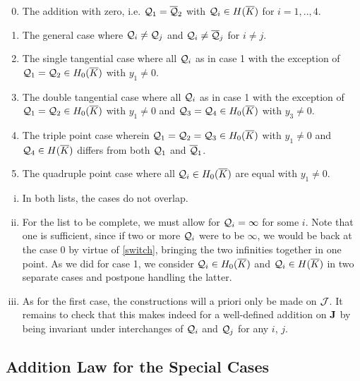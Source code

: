 \documentclass[english,11pt,a4paper]{article}
\begin{document}
\vspace{-3mm}
\fline
\begin{enumerate}\setcounter{enumi}{-1}
  \parskip 1mm
  \item The addition with zero, i.e. $\mathcal{Q}_1 = \overline {\mathcal{Q}}_2$ with $\mathcal{Q}_i \in H(\overline K)$ for $i = 1,..,4$.
  \item The general case where $\mathcal{Q}_i \neq \mathcal{Q}_j$ and $\mathcal{Q}_i \neq \overline {\mathcal{Q}}_j$ for $i \neq j$.
  \item The single tangential case where all $\mathcal{Q}_i$ as in case 1 with the exception of $\mathcal{Q}_1 = \mathcal{Q}_2 \in H_0(\overline K)$ with $y_1 \neq 0$.
  \item The double tangential case where all $\mathcal{Q}_i$ as in case 1 with the exception of $\mathcal{Q}_1 = \mathcal{Q}_2 \in H_0(\overline K)$ with $y_1 \neq 0$ and $\mathcal{Q}_3 = \mathcal{Q}_4 \in H_0(\overline K)$ with $y_3 \neq 0$.
  \item The triple point case wherein $\mathcal{Q}_1=\mathcal{Q}_2=\mathcal{Q}_3 \in H_0(\overline K)$ with $y_1 \neq 0$ and $\mathcal{Q}_4 \in H(\overline K)$ differs from both $\mathcal{Q}_1$ and $\overline {\mathcal{Q}}_1$.
  \item The quadruple point case where all $\mathcal{Q}_i \in H_0(\overline K)$ are equal with $y_1\neq 0$.
\end{enumerate}
\vspace{-2mm}
\fline
\parskip 3mm

\begin{remark}\label{rem}\hfill
\begin{enumerate}[(i)]
  \item In both lists, the cases do not overlap.
  
  \item For the list to be complete, we must allow for $\mathcal{Q}_i = \infty$ for some $i$. Note that one is sufficient, since if two or more $\mathcal{Q}_i$ were to be $\infty$, we would be back at the case 0 by virtue of \eqref{switch}, bringing the two infinities together in one point. As we did for case 1, we consider $\mathcal{Q}_i \in H_0(\overline K)$ and $\mathcal{Q}_i \in H(\overline K)$ in two separate cases and postpone handling the latter.\label{extend}

  \item As for the first case, the constructions will a priori only be made on $\mathcal{J}$. It remains to check that this makes indeed for a well-defined addition on $\mathbf{J}$ by being invariant under interchanges of $\mathcal{Q}_i$ and $\mathcal{Q}_j$ for any $i$, $j$.
\end{enumerate}
\end{remark}

\subsection{Addition Law for the Special Cases}
\end{document}
